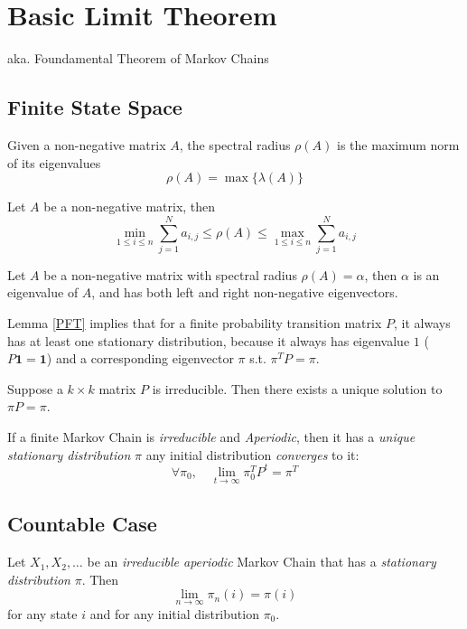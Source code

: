 \section{Basic Limit Theorem}
aka. Foundamental Theorem of Markov Chains

\subsection{Finite State Space}
\begin{definition}
    Given a non-negative matrix $A$, the spectral radius $\rho(A)$ is the maximum norm of its eigenvalues
    \[ \rho(A) = \max\{ \lambda(A) \} \]
\end{definition}
\begin{proposition}
    Let $A$ be a non-negative matrix, then
    \[ \min_{1\le i \le n} \sum_{j=1}^N a_{i,j} \le \rho(A) \le \max_{1\le i \le n} \sum_{j=1}^N a_{i,j} \]
\end{proposition}

\begin{lemma}\label{PFT}
    Let $A$ be a non-negative matrix with spectral radius $\rho(A) = \alpha$, then $\alpha$ is an eigenvalue of $A$, and has both left and right non-negative eigenvectors.
\end{lemma}
\begin{remark}
    Lemma \ref{PFT} implies that for a finite probability transition matrix $P$, it always has at least one stationary distribution, because it always has eigenvalue $1$ ($P\mathbf{1} = \mathbf{1}$) and a corresponding eigenvector $\pi$ s.t. $\pi^TP = \pi$.
\end{remark}

\begin{lemma}
    Suppose a $k \times k$ matrix $P$ is irreducible. Then there exists a unique solution to $\pi P = \pi$.
\end{lemma}

\begin{theorem} If a finite Markov Chain is \emph{irreducible} and \emph{Aperiodic}, then it has a \emph{unique stationary distribution} $\pi$ any initial distribution \emph{converges} to it:
    \[ \forall \pi_0,\quad \lim_{t\to\infty}\pi_0^T P^t = \pi^T \]
\end{theorem}

\subsection{Countable Case}
\begin{theorem}
    Let $X_1, X_2, \dots$ be an \emph{irreducible aperiodic} Markov Chain that has a \emph{stationary distribution} $\pi$. Then
    \[ \lim_{n\to\infty}\pi_n(i) = \pi(i) \]
    for any state $i$ and for any initial distribution $\pi_0$.
\end{theorem}

